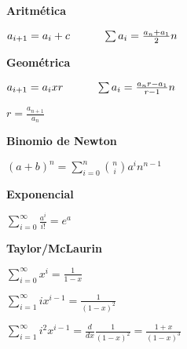 \begin{minipage}{0.22\textwidth}
	{\bf Aritmética}
	\begin{center} $a_{i+1}=a_i+c \hskip 3em \sum a_i = \frac {a_n + a_1}{2} n$\end{center}
	{\bf Geométrica}
	\begin{center} $a_{i+1}=a_ixr \hskip 3em \sum a_i = \frac {a_n{r} - a_1}{r-1} n$\end{center}
	\begin{center} $r = \frac {a_{n+1}}{a_n}$\end{center}
	{\bf Binomio de Newton}
	\begin{center} $(a+b)^n = \sum\limits_{i=0}^{n} \binom{n}{i}a^in^{n-1}$\end{center}
\end{minipage}
\begin{minipage}{0.22\textwidth}
	{\bf Exponencial}
	\begin{center} $\sum\limits_{i=0}^{\infty} \frac {a^i}{i!} = e^a$\end{center}
	{\bf Taylor/McLaurin}
	\begin{center} $\sum\limits_{i=0}^{\infty}  x^i = \frac {1}{1-x}$\end{center}
	\begin{center} $\sum\limits_{i=1}^{\infty}  ix^{i-1} = \frac {1}{(1-x)^2}$\end{center}
	\begin{center} $\sum\limits_{i=1}^{\infty}  i^2x^{i-1} = \frac{d}{dx} \frac {1}{(1-x)^2} = \frac {1+x}{(1-x)^3}$\end{center}
\end{minipage}